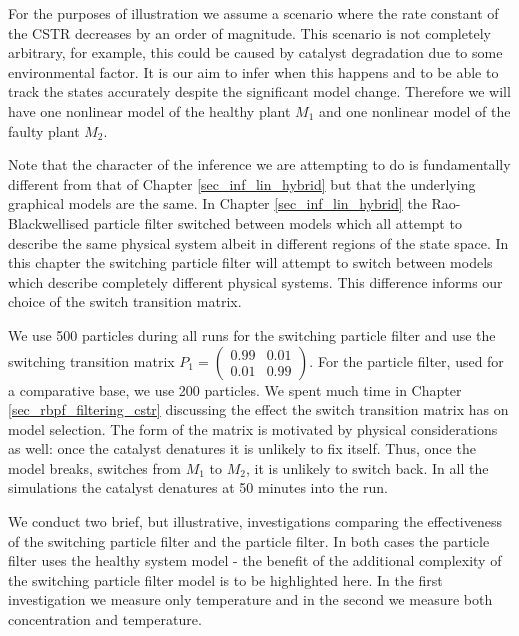 For the purposes of illustration we assume a scenario where the rate constant of the CSTR decreases by an order of magnitude. This scenario is not completely arbitrary, for example, this could be caused by catalyst degradation due to some environmental factor. It is our aim to infer when this happens and to be able to track the states accurately despite the significant model change. Therefore we will have one nonlinear model of the healthy plant $M_1$ and one nonlinear model of the faulty plant $M_2$.

Note that the character of the inference we are attempting to do is fundamentally different from that of Chapter \ref{sec_inf_lin_hybrid} but that the underlying graphical models are the same. In Chapter \ref{sec_inf_lin_hybrid} the Rao-Blackwellised particle filter switched between models which all attempt to describe the same physical system albeit in different regions of the state space. In this chapter the switching particle filter will attempt to switch between models which describe completely different physical systems. This difference informs our choice of the switch transition matrix.

We use 500 particles during all runs for the switching particle filter and use the switching transition matrix $P_1=\begin{pmatrix}
0.99 & 0.01 \\ 0.01 & 0.99
\end{pmatrix}$. For the particle filter, used for a comparative base, we use 200 particles. We spent much time in Chapter \ref{sec_rbpf_filtering_cstr} discussing the effect the switch transition matrix has on model selection. The form of the matrix is motivated by physical considerations as well: once the catalyst denatures it is unlikely to fix itself. Thus, once the model breaks, switches from $M_1$ to $M_2$, it is unlikely to switch back. In all the simulations the catalyst denatures at 50 minutes into the run.

We conduct two brief, but illustrative, investigations comparing the effectiveness of the switching particle filter and the particle filter. In both cases the particle filter uses the healthy system model - the benefit of the additional complexity of the switching particle filter model is to be highlighted here. In the first investigation we measure only temperature and in the second we measure both concentration and temperature. 

